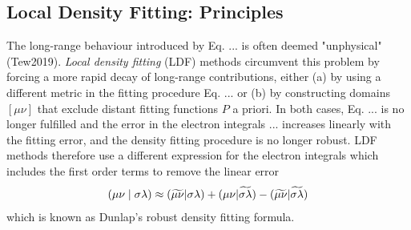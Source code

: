 \subsection{Local Density Fitting: Principles} 
The long-range behaviour introduced by Eq. ... is often deemed "unphysical" (Tew2019). \emph{Local density fitting} (LDF) methods circumvent this problem by forcing a more rapid decay of long-range contributions, either (a) by using a different metric in the fitting procedure Eq. ... or (b) by constructing domains $[\mu\nu]$ that exclude distant fitting functions $P$ a priori. In both cases, Eq. ... is no longer fulfilled and the error in the electron integrals ... increases linearly with the fitting error, and the density fitting procedure is no longer robust. LDF methods therefore use a different expression for the electron integrals which includes the first order terms to remove the linear error
\begin{equation}
\left( \mu\nu \mid \sigma\lambda \right) \approx (\widetilde{\mu\nu}|\sigma\lambda) + (\mu\nu|\widetilde{\sigma\lambda}) - (\widetilde{\mu\nu}|\widetilde{\sigma\lambda})
\end{equation}
\noindent which is known as Dunlap's robust density fitting formula. 
 
